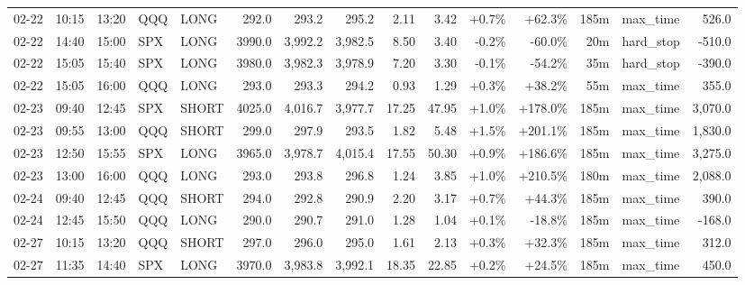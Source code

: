 \documentclass[11pt,a4paper,twoside]{article}
\begin{document}
\begin{landscape}
\begin{center}
\begin{longtable}{>{\color{txtmain}}l l l l l r r r r r r r r >{\color{txtmain}}l r}
02-22 & 10:15 & 13:20 & QQQ & LONG & 292.0 & 293.2 & 295.2 & 2.11 & 3.42 & \textcolor{wingreen}{+0.7\%} & \textcolor{wingreen}{+62.3\%} & 185m & max\_time & \textcolor{wingreen}{526.0} \\
02-22 & 14:40 & 15:00 & SPX & LONG & 3990.0 & 3,992.2 & 3,982.5 & 8.50 & 3.40 & \textcolor{lossred}{-0.2\%} & \textcolor{lossred}{-60.0\%} & 20m & hard\_stop & \textcolor{lossred}{-510.0} \\
02-22 & 15:05 & 15:40 & SPX & LONG & 3980.0 & 3,982.3 & 3,978.9 & 7.20 & 3.30 & \textcolor{lossred}{-0.1\%} & \textcolor{lossred}{-54.2\%} & 35m & hard\_stop & \textcolor{lossred}{-390.0} \\
02-22 & 15:05 & 16:00 & QQQ & LONG & 293.0 & 293.3 & 294.2 & 0.93 & 1.29 & \textcolor{wingreen}{+0.3\%} & \textcolor{wingreen}{+38.2\%} & 55m & max\_time & \textcolor{wingreen}{355.0} \\
02-23 & 09:40 & 12:45 & SPX & SHORT & 4025.0 & 4,016.7 & 3,977.7 & 17.25 & 47.95 & \textcolor{wingreen}{+1.0\%} & \textcolor{wingreen}{+178.0\%} & 185m & max\_time & \textcolor{wingreen}{3,070.0} \\
02-23 & 09:55 & 13:00 & QQQ & SHORT & 299.0 & 297.9 & 293.5 & 1.82 & 5.48 & \textcolor{wingreen}{+1.5\%} & \textcolor{wingreen}{+201.1\%} & 185m & max\_time & \textcolor{wingreen}{1,830.0} \\
02-23 & 12:50 & 15:55 & SPX & LONG & 3965.0 & 3,978.7 & 4,015.4 & 17.55 & 50.30 & \textcolor{wingreen}{+0.9\%} & \textcolor{wingreen}{+186.6\%} & 185m & max\_time & \textcolor{wingreen}{3,275.0} \\
02-23 & 13:00 & 16:00 & QQQ & LONG & 293.0 & 293.8 & 296.8 & 1.24 & 3.85 & \textcolor{wingreen}{+1.0\%} & \textcolor{wingreen}{+210.5\%} & 180m & max\_time & \textcolor{wingreen}{2,088.0} \\
02-24 & 09:40 & 12:45 & QQQ & SHORT & 294.0 & 292.8 & 290.9 & 2.20 & 3.17 & \textcolor{wingreen}{+0.7\%} & \textcolor{wingreen}{+44.3\%} & 185m & max\_time & \textcolor{wingreen}{390.0} \\
02-24 & 12:45 & 15:50 & QQQ & LONG & 290.0 & 290.7 & 291.0 & 1.28 & 1.04 & \textcolor{wingreen}{+0.1\%} & \textcolor{lossred}{-18.8\%} & 185m & max\_time & \textcolor{lossred}{-168.0} \\
02-27 & 10:15 & 13:20 & QQQ & SHORT & 297.0 & 296.0 & 295.0 & 1.61 & 2.13 & \textcolor{wingreen}{+0.3\%} & \textcolor{wingreen}{+32.3\%} & 185m & max\_time & \textcolor{wingreen}{312.0} \\
02-27 & 11:35 & 14:40 & SPX & LONG & 3970.0 & 3,983.8 & 3,992.1 & 18.35 & 22.85 & \textcolor{wingreen}{+0.2\%} & \textcolor{wingreen}{+24.5\%} & 185m & max\_time & \textcolor{wingreen}{450.0} \\

\end{longtable}
\end{center}
\end{landscape}
\end{document}
